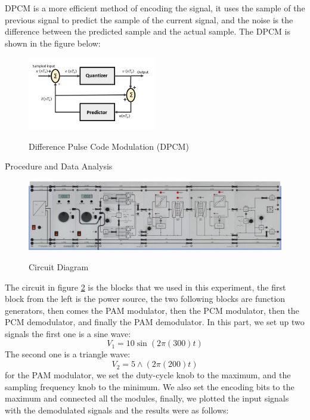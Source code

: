 \documentclass[12pt]{article}
\begin{document}
DPCM is a more efficient method of encoding the signal, it uses the sample of the previous signal to predict the sample of the current signal, and the noise is the difference between the predicted sample and the actual sample. The DPCM is shown in the figure below:
\begin{figure}[H]
    \centering
    \includegraphics[width=0.5\textwidth]{assets/dpcm_transmitter.jpg}
    \caption{Difference Pulse Code Modulation (DPCM)}
    \label{fig:3}
    \cite{tutorialspoint2}
\end{figure}
\clearpage
\h{Procedure and Data Analysis}
\begin{figure}[H]
    \centering
    \includegraphics[width=\textwidth]{assets/main/2023-08-26-21-51-59.png}
    \caption{Circuit Diagram}
    \cite{manual}
    \label{fig:1}
\end{figure}
The circuit in figure \ref{fig:1} is the blocks that we used in this experiment, the first block from the left is the power source, the two following blocks are function generators, then comes the PAM modulator, then the PCM modulator, then the PCM demodulator, and finally the PAM demodulator.
In this part, we set up two signals the first one is a sine wave:
\begin{equation}
    V_{1} = 10 \sin(2\pi (300) t)
\end{equation}
The second one is a triangle wave:
\begin{equation}
    V_{2} = 5 \wedge(2\pi (200) t)
\end{equation}
for the PAM modulator, we set the duty-cycle knob to the maximum, and the sampling frequency knob to the minimum. We also set the encoding bits to the maximum and connected all the modules, finally, we plotted the input signals with the demodulated signals and the results were as follows:
\end{document}
